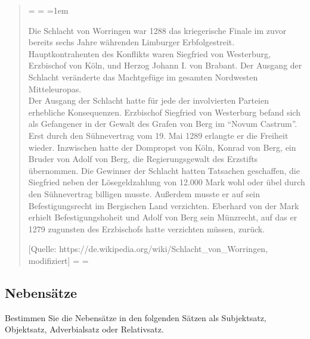 \documentclass[12pt,a4paper,twoside]{article}
\newcommand{\rot}[1]{\textcolor{rot}{#1}}
\newcommand{\syntaxaufgabe}{}
\newcommand{\FUBreak}{\clearpage}
\newcommand{\syntaxaufgabe}{\textbf{\rot{Syntax-Vorlesung}}\ |\ }
\newcommand{\FUBreak}{}
\newenvironment{spread}
{%
  \newdimen\origiwspc%
  \newdimen\origiwstr%
  \origiwspc=\fontdimen2\font%
  \origiwstr=\fontdimen3\font%
  \fontdimen2\font=1em%
  \doublespacing%
}{%
  \fontdimen2\font=\origiwspc%
  \fontdimen3\font=\origiwstr%
}
\begin{document}
\begin{quote}
  \begin{spread}
  Die Schlacht von Worringen war 1288 das kriegerische Finale im zuvor bereits sechs Jahre währenden Limburger Erbfolgestreit.
  Hauptkontrahenten des Konflikts waren Siegfried von Westerburg, Erzbischof von Köln, und Herzog Johann I. von Brabant.
  Der Ausgang der Schlacht veränderte das Machtgefüge im gesamten Nordwesten Mitteleuropas.\\
  Der Ausgang der Schlacht hatte für jede der involvierten Parteien erhebliche Konsequenzen.
  Erzbischof Siegfried von Westerburg befand sich als Gefangener in der Gewalt des Grafen von Berg im "`Novum Castrum"'.
  Erst durch den Sühnevertrag vom 19. Mai 1289 erlangte er die Freiheit wieder.
  Inzwischen hatte der Dompropst von Köln, Konrad von Berg, ein Bruder von Adolf von Berg, die Regierungsgewalt des Erzstifts übernommen.
  Die Gewinner der Schlacht hatten Tatsachen geschaffen, die Siegfried neben der Lösegeldzahlung von 12.000 Mark wohl oder übel durch den Sühnevertrag billigen musste.
  Außerdem musste er auf sein Befestigungsrecht im Bergischen Land verzichten.
  Eberhard von der Mark erhielt Befestigungshoheit und Adolf von Berg sein Münzrecht, auf das er 1279 zugunsten des Erzbischofs hatte verzichten müssen, zurück.

  \footnotesize{[Quelle: https://de.wikipedia.org/wiki/Schlacht\_von\_Worringen, modifiziert]}
  \end{spread}
\end{quote}


\FUBreak

\subsection{\syntaxaufgabe Nebensätze}

Bestimmen Sie die Nebensätze in den folgenden Sätzen als Subjektsatz, Objektsatz, Adverbialsatz oder Relativsatz.
\end{document}
